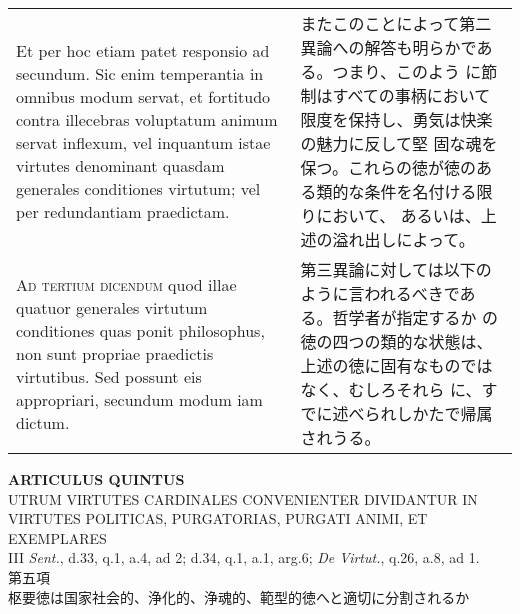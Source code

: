 \documentclass[10pt]{jsarticle}
\begin{document}
\begin{longtable}{p{21em}p{21em}}
 
\\



Et per hoc etiam patet responsio ad secundum. Sic enim temperantia in
omnibus modum servat, et fortitudo contra illecebras voluptatum animum
servat inflexum, vel inquantum istae virtutes denominant quasdam
generales conditiones virtutum; vel per redundantiam praedictam.


&

 またこのことによって第二異論への解答も明らかである。つまり、このよう
 に節制はすべての事柄において限度を保持し、勇気は快楽の魅力に反して堅
 固な魂を保つ。これらの徳が徳のある類的な条件を名付ける限りにおいて、
 あるいは、上述の溢れ出しによって。

 
\\



{\scshape Ad tertium dicendum} quod illae quatuor generales virtutum
conditiones quas ponit philosophus, non sunt propriae praedictis
virtutibus. Sed possunt eis appropriari, secundum modum iam dictum.

&

 第三異論に対しては以下のように言われるべきである。哲学者が指定するか
 の徳の四つの類的な状態は、上述の徳に固有なものではなく、むしろそれら
 に、すでに述べられしかたで帰属されうる。


\end{longtable}
\newpage
{}
\begin{center}
{\Large {\bf ARTICULUS QUINTUS}}\\
{\large UTRUM VIRTUTES CARDINALES CONVENIENTER DIVIDANTUR IN VIRTUTES POLITICAS, PURGATORIAS, PURGATI ANIMI, ET EXEMPLARES}\\
{\footnotesize III {\itshape Sent.}, d.33, q.1, a.4, ad 2; d.34, q.1, a.1, arg.6; {\itshape De Virtut.}, q.26, a.8, ad 1.}\\
{\Large 第五項\\枢要徳は国家社会的、浄化的、浄魂的、範型的徳へと適切に分割されるか}
\end{center}
\end{document}

